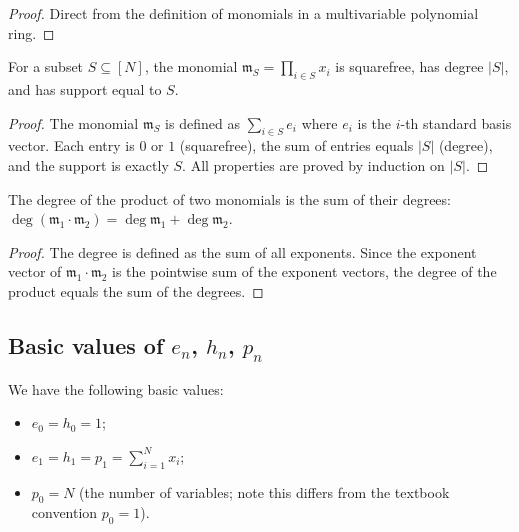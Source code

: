 \begin{proof}
Direct from the definition of monomials in a multivariable polynomial ring.
\end{proof}

\begin{lemma}
\label{lem.sf.monomial-ofFinset}
\leanhelper
\leanok
For a subset $S \subseteq [N]$, the monomial $\mathfrak{m}_S = \prod_{i \in S} x_i$
is squarefree, has degree $|S|$, and has support equal to $S$.
\end{lemma}

\begin{proof}
\leanok
The monomial $\mathfrak{m}_S$ is defined as $\sum_{i \in S} e_i$ where $e_i$ is the
$i$-th standard basis vector. Each entry is $0$ or $1$ (squarefree),
the sum of entries equals $|S|$ (degree), and the support is exactly $S$.
All properties are proved by induction on $|S|$.
\end{proof}

\begin{lemma}
\label{lem.sf.monomial-degree-add}
\leanhelper
\leanok
The degree of the product of two monomials is the sum of their degrees:
$\deg(\mathfrak{m}_1 \cdot \mathfrak{m}_2) = \deg \mathfrak{m}_1 + \deg \mathfrak{m}_2$.
\end{lemma}

\begin{proof}
\leanok
The degree is defined as the sum of all exponents. Since the exponent vector
of $\mathfrak{m}_1 \cdot \mathfrak{m}_2$ is the pointwise sum of the
exponent vectors, the degree of the product equals the sum of the degrees.
\end{proof}

\subsection{Basic values of $e_n$, $h_n$, $p_n$}

\begin{lemma}
\label{lem.sf.basic-values}
\leanhelper
\leanok
We have the following basic values:
\begin{itemize}
\item $e_0 = h_0 = 1$;
\item $e_1 = h_1 = p_1 = \sum_{i=1}^N x_i$;
\item $p_0 = N$ (the number of variables; note this differs from the textbook convention $p_0 = 1$).
\end{itemize}
\end{lemma}

